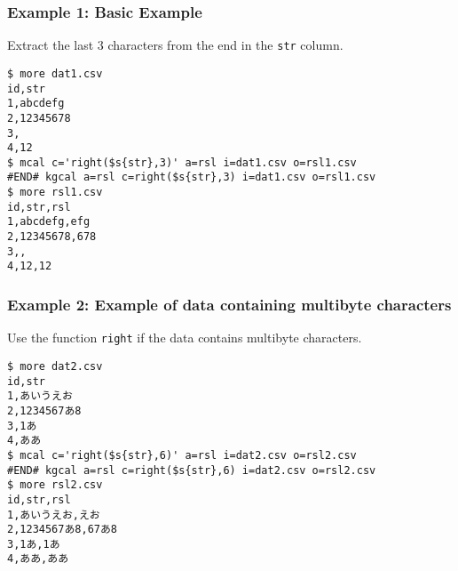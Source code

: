 \subsubsection*{Example 1: Basic Example}

Extract the last 3 characters from the end in the \verb|str| column.


\begin{Verbatim}[baselinestretch=0.7,frame=single]
$ more dat1.csv
id,str
1,abcdefg
2,12345678
3,
4,12
$ mcal c='right($s{str},3)' a=rsl i=dat1.csv o=rsl1.csv
#END# kgcal a=rsl c=right($s{str},3) i=dat1.csv o=rsl1.csv
$ more rsl1.csv
id,str,rsl
1,abcdefg,efg
2,12345678,678
3,,
4,12,12
\end{Verbatim}
\subsubsection*{Example 2: Example of data containing multibyte characters}

Use the function \verb|right| if the data contains multibyte characters.


\begin{Verbatim}[baselinestretch=0.7,frame=single]
$ more dat2.csv
id,str
1,あいうえお
2,1234567あ8
3,1あ
4,ああ
$ mcal c='right($s{str},6)' a=rsl i=dat2.csv o=rsl2.csv
#END# kgcal a=rsl c=right($s{str},6) i=dat2.csv o=rsl2.csv
$ more rsl2.csv
id,str,rsl
1,あいうえお,えお
2,1234567あ8,67あ8
3,1あ,1あ
4,ああ,ああ
\end{Verbatim}
